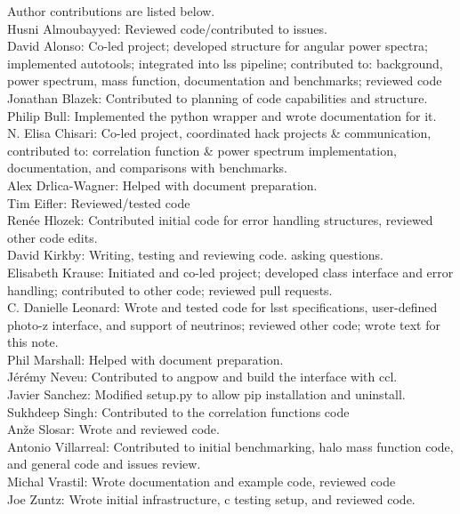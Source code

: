 Author contributions are listed below. \\
Husni Almoubayyed: Reviewed code/contributed to issues. \\
David Alonso: Co-led project; developed structure for angular power spectra; implemented autotools; integrated into lss pipeline; contributed to: background, power spectrum, mass function, documentation and benchmarks; reviewed code \\
Jonathan Blazek: Contributed to planning of code capabilities and structure. \\
Philip Bull: Implemented the python wrapper and wrote documentation for it. \\
N. Elisa Chisari: Co-led project, coordinated hack projects \& communication, contributed to: correlation function \& power spectrum implementation, documentation, and comparisons with benchmarks. \\
Alex Drlica-Wagner: Helped with document preparation. \\
Tim Eifler: Reviewed/tested code \\
Ren\'ee Hlozek: Contributed initial code for error handling structures, reviewed other code edits. \\
David Kirkby: Writing, testing and reviewing code. asking questions. \\
Elisabeth Krause: Initiated and co-led project; developed class interface and error handling; contributed to other code; reviewed pull requests. \\
C. Danielle Leonard: Wrote and tested code for lsst specifications, user-defined photo-z interface, and support of neutrinos; reviewed other code; wrote text for this note. \\
Phil Marshall: Helped with document preparation. \\
J\'er\'emy Neveu: Contributed to angpow and build the interface with ccl. \\
Javier Sanchez: Modified setup.py to allow pip installation and uninstall. \\
Sukhdeep Singh: Contributed to the correlation functions code \\
An\v{z}e Slosar: Wrote and reviewed code. \\
Antonio Villarreal: Contributed to initial benchmarking, halo mass function code, and general code and issues review. \\
Michal Vrastil: Wrote documentation and example code, reviewed code \\
Joe Zuntz: Wrote initial infrastructure, c testing setup, and reviewed code. \\
